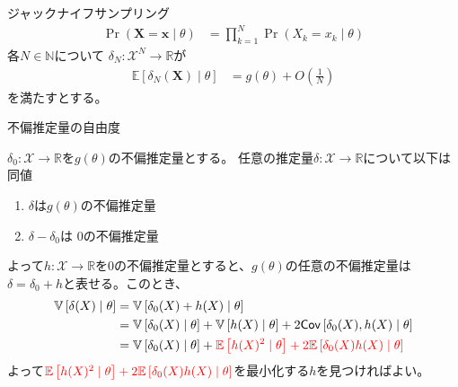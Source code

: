 \documentclass[lualatex,handout]{beamer}
\newcommand{\mycolor}[2]{%
  \begingroup
  \colorlet{currentcolor}{.}%
  \color{#1}#2%
  \color{currentcolor}%
  \endgroup
}
\newcommand{\emm}[1]{\mycolor{red}{#1}}
\newcommand{\expt}[1]{\mathbb{E}\left[#1\right]}
\newcommand{\var}[1]{\mathbb{V}\left[#1\right]}
\newcommand{\cov}[1]{\mathsf{Cov}\left[#1\right]}
\theoremstyle{definition}
\begin{document}
\begin{frame}{ジャックナイフサンプリング}
\begin{align*}
\Pr(\symbf{X}=\symbf{x}\mid\theta) &= \prod_{k=1}^N \Pr(X_k=x_k\mid\theta)
\end{align*}
各$N\in\mathbb{N}$について
$\delta_N\colon \mathcal{X}^N\to\mathbb{R}$が
\begin{align*}
\expt{\delta_N(\symbf{X})\mid\theta} &= g(\theta) + O\left(\frac{1}{N}\right)
\end{align*}
を満たすとする。
\end{frame}
\fi

\begin{frame}{不偏推定量の自由度}
\begin{fact}
$\delta_0\colon\mathcal{X}\to\mathbb{R}$を$g(\theta)$の不偏推定量とする。
任意の推定量$\delta\colon\mathcal{X}\to\mathbb{R}$について以下は同値
\begin{enumerate}
\item $\delta$は$g(\theta)$の不偏推定量
\item $\delta-\delta_0$は $0$の不偏推定量
\end{enumerate}
\end{fact}
よって$h\colon\mathcal{X}\to\mathbb{R}$を$0$の不偏推定量とすると、$g(\theta)$の任意の不偏推定量は$\delta=\delta_0+h$と表せる。このとき、
\begin{align*}
\var{\delta(X)\mid\theta}&=
\var{\delta_0(X)+h(X)\mid\theta}\\
&= \var{\delta_0(X)\mid\theta}+\var{h(X)\mid\theta}+2\cov{\delta_0(X), h(X)\mid\theta}\\
&= \var{\delta_0(X)\mid\theta}+\emm{\expt{h(X)^2\mid\theta}+2\expt{\delta_0(X)h(X)\mid\theta}}
\end{align*}
よって$\emm{\expt{h(X)^2\mid\theta}+2\expt{\delta_0(X)h(X)\mid\theta}}$を最小化する$h$を見つければよい。
\end{frame}
\end{document}

